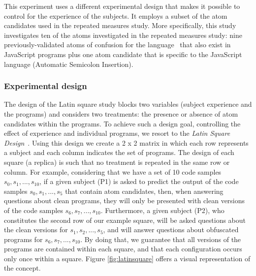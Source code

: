 This experiment uses a different experimental design that makes it possible to control for the experience of the subjects. It employs a subset of the atom candidates used in the repeated measures study. More specifically, this study investigates ten of the atoms investigated in the repeated measures study: 
nine previously-validated atoms of confusion for the \clang language~\cite{DBLP:conf/sigsoft/GopsteinIYDZYC17} that also exist in JavaScript programs plus one atom candidate that is specific to the JavaScript language (Automatic Semicolon Insertion). 

\subsubsection*{Experimental design} 

The design of the Latin square study blocks two variables (subject experience and the programs) and considers two treatments: the presence or absence of atom candidates within the programs. To achieve such a design goal, controlling the effect of experience and individual programs, we resort to the \textit{Latin Square Design}~\cite{Hunter-Experimenters}. Using this design we create a 2 x 2 matrix in which each row represents a subject and each column indicates the set of programs. The design of each square (a replica) is such that no treatment is repeated in the same row or column. For example, considering that we have a set of 10
code samples $s_0, s_1, ..., s_{10}$, if a given subject (P1) is asked to predict the output of the code samples $s_0, s_1, ..., s_5$ that contain atom candidates, then, when answering questions about clean programs, they will only be presented with clean versions of the code samples $s_6, s_7,..., s_{10}$. Furthermore, a given subject (P2), who constitutes the second row of our example square, will be asked questions about the clean versions for $s_1, s_2, ..., s_5$, and will answer questions about obfuscated programs for $s_6, s_7,..., s_{10}$. By doing that, we guarantee that all versions of the programs are contained within each square, and that each configuration occurs only once within a square. Figure \ref{fig:latinsquare} offers a visual representation of the concept.

